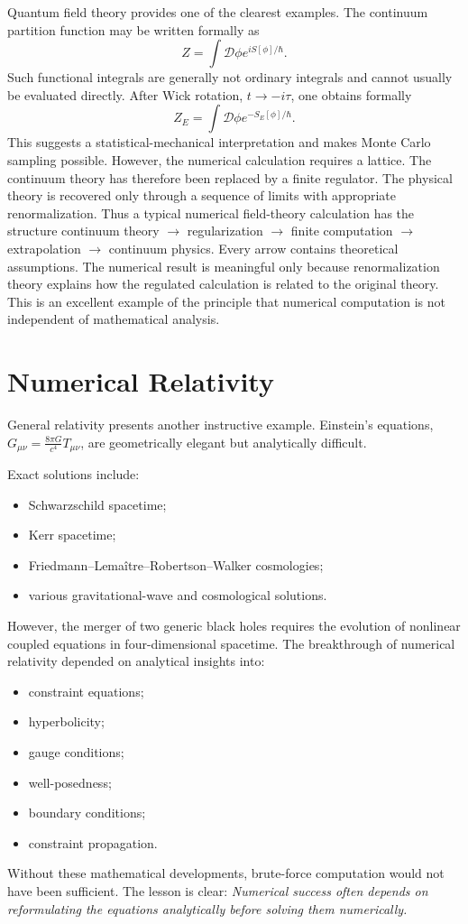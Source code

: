 Quantum field theory provides one of the clearest examples.
The continuum partition function may be written formally as
\[Z=\int\mathcal{D}\phi e^{iS[\phi]/\hbar}.\]
Such functional integrals are generally not ordinary integrals and cannot 
usually be evaluated directly.
After Wick rotation, $t\rightarrow -i\tau$, one obtains formally
\[Z_E=\int\mathcal{D}\phi e^{-S_E[\phi]/\hbar}.\]
This suggests a statistical-mechanical interpretation and makes Monte Carlo sampling possible.
However, the numerical calculation requires a lattice.
The continuum theory has therefore been replaced by a finite regulator.
The physical theory is recovered only through a sequence of limits
with appropriate renormalization.
Thus a typical numerical field-theory calculation has the structure
continuum theory $\rightarrow$ regularization $\rightarrow$
finite computation $\rightarrow$ extrapolation $\rightarrow$ continuum physics.
Every arrow contains theoretical assumptions.
The numerical result is meaningful only because renormalization theory explains
how the regulated calculation is related to the original theory.
This is an excellent example of the principle that numerical computation is not
independent of mathematical analysis.

\section{ Numerical Relativity}
\label{nm:rel}

General relativity presents another instructive example.
Einstein's equations,$G_{\mu\nu}=\frac{8\pi G}{c^4}T_{\mu\nu}$,
are geometrically elegant but analytically difficult.

Exact solutions include:
\begin{itemize}
\item Schwarzschild spacetime;
\item Kerr spacetime;
\item Friedmann--Lemaître--Robertson--Walker cosmologies;
\item various gravitational-wave and cosmological solutions.
\end{itemize}
However, the merger of two generic black holes requires the evolution of
nonlinear coupled equations in four-dimensional spacetime.
The breakthrough of numerical relativity depended on analytical insights into:
\begin{itemize}
\item constraint equations;
\item hyperbolicity;
\item gauge conditions;
\item well-posedness;
\item boundary conditions;
\item constraint propagation.
\end{itemize}
Without these mathematical developments, brute-force computation would not have
been sufficient.
The lesson is clear:
\emph{Numerical success often depends on reformulating the equations 
analytically before solving them numerically.}

